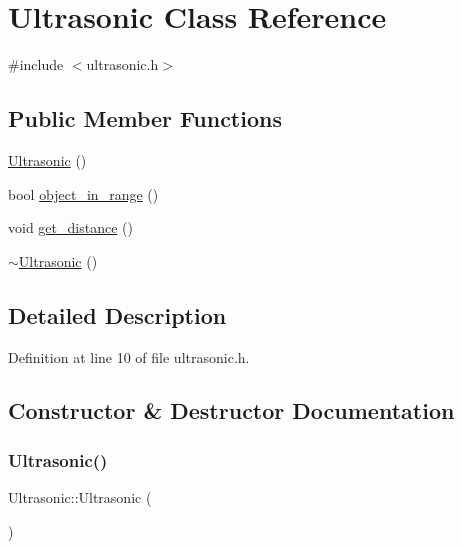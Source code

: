 \hypertarget{class_ultrasonic}{}\section{Ultrasonic Class Reference}
\label{class_ultrasonic}


{\ttfamily \#include $<$ultrasonic.\+h$>$}

\subsection*{Public Member Functions}
\begin{DoxyCompactItemize}
\item 
\mbox{\hyperlink{class_ultrasonic_aca6777e380e8df649cc547e0a5fdd417}{Ultrasonic}} ()
\item 
bool \mbox{\hyperlink{class_ultrasonic_aae6ae7ff42f37a52835dc66bba7e0201}{object\+\_\+in\+\_\+range}} ()
\item 
void \mbox{\hyperlink{class_ultrasonic_a3d4ff1956578fb0bec95ee140d30b751}{get\+\_\+distance}} ()
\item 
\mbox{\hyperlink{class_ultrasonic_ab5066b2bfeac723140c18b9f8340abad}{$\sim$\+Ultrasonic}} ()
\end{DoxyCompactItemize}


\subsection{Detailed Description}


Definition at line 10 of file ultrasonic.\+h.



\subsection{Constructor \& Destructor Documentation}
\mbox{\label{class_ultrasonic_aca6777e380e8df649cc547e0a5fdd417}} 
\subsubsection{\texorpdfstring{Ultrasonic()}{Ultrasonic()}}
{\footnotesize\ttfamily Ultrasonic\+::\+Ultrasonic (\begin{DoxyParamCaption}{ }\end{DoxyParamCaption})}



